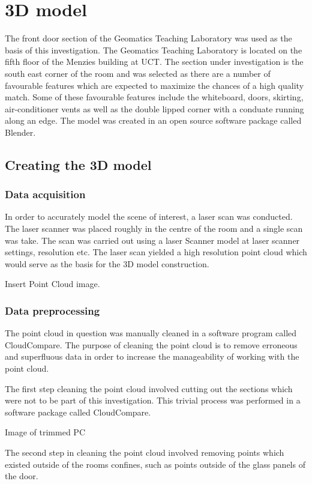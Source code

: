 \documentclass[11pt,a4paper]{report}
\begin{document}
	\section{3D model}
		The front door section of the Geomatics Teaching Laboratory was used as the basis of this investigation. The Geomatics Teaching Laboratory is located on the fifth floor of the Menzies building at UCT. The section under investigation is the south east corner of the room and was selected as there are a number of favourable features which are expected to maximize the chances of a high quality match. Some of these favourable features include the whiteboard, doors, skirting, air-conditioner vents as well as the double lipped corner with a conduate running along an edge. The model was created in an open source software package called Blender.
		\subsection{Creating the 3D model}
			\subsubsection{Data acquisition}
				In order to accurately model the scene of interest, a laser scan was conducted. The laser scanner was placed roughly in the centre of the room and a single scan was take. The scan was carried out using a {{laser Scanner model}} at {{laser scanner settings, resolution etc}}. The laser scan yielded a high resolution point cloud which would serve as the basis for the 3D model construction.
				
				{{Insert Point Cloud image}}.
				
			\subsubsection{Data preprocessing}
				The point cloud in question was manually cleaned in a software program called CloudCompare. The purpose of cleaning the point cloud is to remove erroneous and superfluous data in order to increase the manageability of working with the point cloud.
	
				The first step cleaning the point cloud involved cutting out the sections which were not to be part of this investigation. This trivial process was performed in a software package called CloudCompare.
				
				{{Image of trimmed PC}}
				
				The second step in cleaning the point cloud involved removing points which existed outside of the rooms confines, such as points outside of the glass panels of the door.
				
\end{document}
